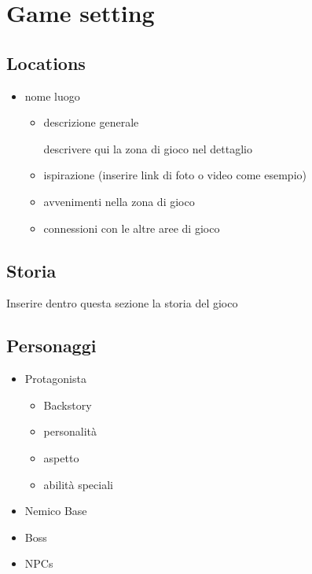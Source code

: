 \documentclass{report}
\begin{document}
\section{Game setting}
\subsection{Locations}
\begin{itemize}
\item nome luogo
      \begin{itemize}
        \item descrizione generale

        descrivere qui la zona di gioco nel dettaglio
        
        \item ispirazione (inserire link di foto o video come esempio)
        \item avvenimenti nella zona di gioco
        \item connessioni con le altre aree di gioco
      \end{itemize}
\end{itemize}
\subsection{Storia}

Inserire dentro questa sezione la storia del gioco
\subsection{Personaggi}
\begin{itemize}
    \item Protagonista
        \begin{itemize}
            \item Backstory
            \item personalità
            \item aspetto
            \item abilità speciali
        \end{itemize}
    \item Nemico Base
    \item Boss
    \item NPCs
\end{itemize}
\end{document}
